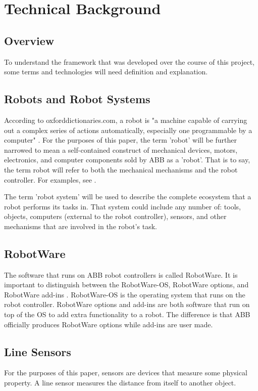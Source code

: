 \documentclass{cslthse-msc}
\begin{document}
\chapter{Technical Background}
\label{sec:Tech_Back}

\section{Overview}
\label{sec:Tech_Back:Overview}
To understand the framework that was developed over the course of this project, some terms and technologies will need definition and explanation.



\section{Robots and Robot Systems}
\label{sec:Tech_Back:Rob_Syst}
According to oxforddictionaries.com, a robot is "a machine capable of carrying out a complex series of actions automatically, especially one programmable by a computer" \cite{Def:Robot}. For the purposes of this paper, the term 'robot' will be further narrowed to mean a self-contained construct of mechanical devices, motors, electronics, and computer components sold by ABB as a 'robot'. That is to say, the term robot will refer to both the mechanical mechanisms and the robot controller. For examples, see \cite{ABB:Products}. \par
The term 'robot system' will be used to describe the complete ecosystem that a robot performs its tasks in. That system could include any number of: tools, objects, computers (external to the robot controller), sensors, and other mechanisms that are involved in the robot's task. 

\section{RobotWare}
\label{sec:Tech_Back:RobotWare}
The software that runs on ABB robot controllers is called RobotWare. It is important to distinguish between the RobotWare-OS, RobotWare options, and RobotWare add-ins \cite[Sec. 1]{ABB:controller_software}. RobotWare-OS is the operating system that runs on the robot controller. RobotWare options and add-ins are both software that run on top of the OS to add extra functionality to a robot. The difference is that ABB officially produces RobotWare options while add-ins are user made. 

\section{Line Sensors}
\label{sec:Tech_Back:Line_Sensors}
For the purposes of this paper, sensors are devices that measure some physical property. A line sensor measures the distance from itself to another object. 
\end{document}
